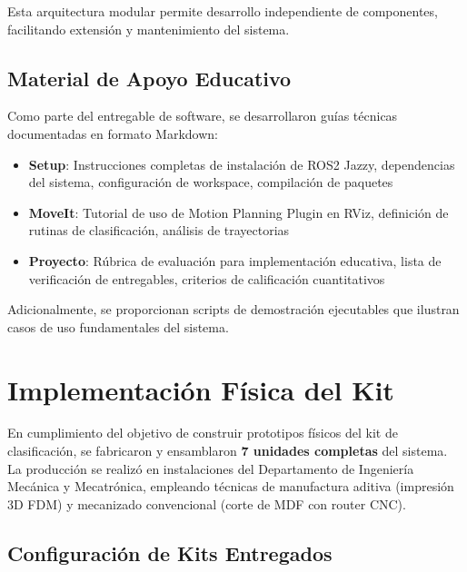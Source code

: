Esta arquitectura modular permite desarrollo independiente de componentes, facilitando extensión y mantenimiento del sistema.

\subsection{Material de Apoyo Educativo}

Como parte del entregable de software, se desarrollaron guías técnicas documentadas en formato Markdown:

\begin{itemize}
    \item \textbf{Setup}: Instrucciones completas de instalación de ROS2 Jazzy, dependencias del sistema, configuración de workspace, compilación de paquetes
    
    \item \textbf{MoveIt}: Tutorial de uso de Motion Planning Plugin en RViz, definición de rutinas de clasificación, análisis de trayectorias
    
    \item \textbf{Proyecto}: Rúbrica de evaluación para implementación educativa, lista de verificación de entregables, criterios de calificación cuantitativos
\end{itemize}

Adicionalmente, se proporcionan scripts de demostración ejecutables que ilustran casos de uso fundamentales del sistema.

\section{Implementación Física del Kit}

En cumplimiento del objetivo de construir prototipos físicos del kit de clasificación, se fabricaron y ensamblaron \textbf{7 unidades completas} del sistema. La producción se realizó en instalaciones del Departamento de Ingeniería Mecánica y Mecatrónica, empleando técnicas de manufactura aditiva (impresión 3D FDM) y mecanizado convencional (corte de MDF con router CNC).

\subsection{Configuración de Kits Entregados}

